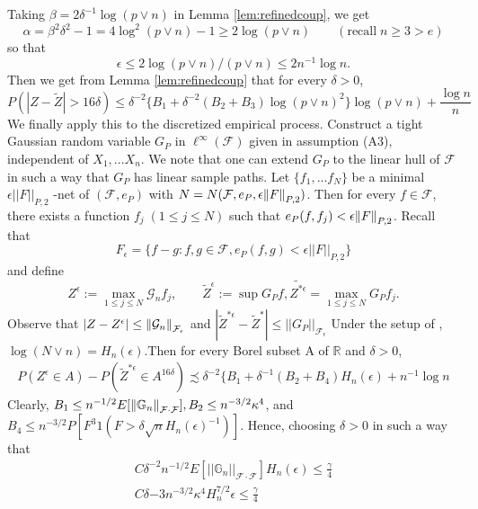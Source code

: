 \documentclass{article}
\begin{document}
Taking $\beta = 2 \delta^{-1} \log (p \lor n ) $ in Lemma \ref{lem:refinedcoup}, we get 
\[\alpha = \beta^2 \delta^2 -1  = 4 \log ^2 ( p \lor n) -1 \geq 2 \log ( p \lor n)\qquad(\text{recall}\;n \geq 3 > e)\]
so that
\[\epsilon \leq 2 \log( p \lor n) / ( p \lor n ) \leq 2 n^{-1} \log n.\]
Then we get from Lemma \ref{lem:refinedcoup} that for every $\delta > 0 $, 
\[P( | Z  - \tilde{Z} | >  16 \delta ) \leq \delta^{-2}\{ B_1 + \delta^{-2} ( B_2 + B_3)\log(p \lor n )^2\} \log ( p \lor n) + \frac{ \log n }{n}\]
We finally apply this to the discretized empirical process. Construct a tight Gaussian random variable $G_P$ in $ \ell^ \infty ( \mathcal{F}) $ given in assumption (A3), independent of $ X_1, ...X_n$. We note that one can extend $G_P$ to the linear hull of $\mathcal{F}$  in such a way that $G_P$ has linear sample paths.
Let $\{ f_1, ... f_N \}$ be a minimal $ \epsilon || F|| _{P,2}$ -net of $( \mathcal{F}, e_P)$ with $ N = N( \mathcal{F}, e_P, \epsilon \norm{ F}_{P,2}) $. Then for every $f\in \mathcal{F}$, there exists a function $f_j\;(1 \leq j \leq N)$ such that $ e_P( f, f_j) < \epsilon \norm{F}_{ P,2}$. Recall that 
\[F_{ \epsilon} = \{ f- g: f, g \in \mathcal{F} , e_P(f,g)< \epsilon || F||_{P,2} \}\]
and define 
\begin{equation*}
    Z^ \epsilon := \max _{ 1 \leq j \leq N} \mathcal{G}_n f _j,\qquad \tilde{Z}^\epsilon:= \sup G_P f , \tilde{Z^{* \epsilon}} = \max_{1 \leq j \leq N} G_P f_j.
\end{equation*}
Observe that $ \abs{Z - Z^ \epsilon}\leq \norm{\mathcal{G}_n}_{ \mathcal{F}_\epsilon} $ and $ | \tilde{Z}^{ * \epsilon} - \tilde{Z}^ { *}  | \leq || G_P ||_{ \mathcal{F}_\epsilon} $
Under the setup of \cite{citecher sup}, $\log(N \lor n )= H_n (\epsilon) $.Then for every Borel subset A of $\mathbb{R}$ and $\delta>0$, 
\begin{align*}
    P(Z^\epsilon \in A)  - P( \tilde{Z}^{* \epsilon} \in A^{16 \delta})
\precsim \delta^{-2} \{ B_1 + \delta^{-1} ( B_2 + B_4 )H_n (\epsilon) + n^{-1} \log n 
\end{align*}
Clearly, $B_1 \leq n^{-1/2} E[ \norm{\mathbb{G}_n}_{\mathcal{F}\cdot \mathcal{F}} ] , B_2 \leq n^{-3/2} \kappa^4$, and $ B_4 \leq n^{-3/2} P[ F^3 1( F > \delta \sqrt{n} H_n (\epsilon)^{-1})]$. Hence, choosing $\delta >0$ in such a way that 
\begin{align*}
    C \delta^{-2} n^{-1/2} E[ ||\mathbb{G}_n||_{\mathcal{F}\cdot \mathcal{F}}] H_n ( \epsilon) \leq \frac{ \gamma}{4}\\
    C \delta{-3} n^{-3/2} \kappa^4 H_n^{7/2}  \epsilon \leq \frac{\gamma}{4}
 \end{align*}
\end{document}
